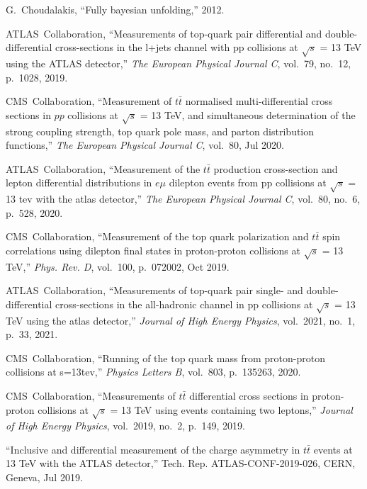 \documentclass[12pt]{article}
\begin{document}
\begin{thebibliography}{99}
G.~Choudalakis, ``Fully bayesian unfolding,'' 2012.

ATLAS~Collaboration, ``Measurements of top-quark pair differential and
  double-differential cross-sections in the l+jets channel with pp collisions at
  $\sqrt{s}$ = 13 TeV using the ATLAS
  detector,'' {\em The European Physical Journal C}, vol.~79, no.~12, p.~1028,
  2019.

CMS~Collaboration, ``Measurement of $t\bar{t}$ normalised
  multi-differential cross sections in $pp$ collisions
  at $\sqrt{s}$ = 13 TeV, and simultaneous determination of the
  strong coupling strength, top quark pole mass, and parton distribution
  functions,'' {\em The European Physical Journal C}, vol.~80, Jul 2020.

ATLAS~Collaboration, ``Measurement of the $t\bar{t}$ production cross-section and
  lepton differential distributions in $e\mu$ dilepton events from pp
  collisions at $\sqrt{s}$ = 13 tev with the atlas detector,'' {\em The
  European Physical Journal C}, vol.~80, no.~6, p.~528, 2020.

CMS~Collaboration, ``Measurement of the top quark polarization and $t\bar{t}$
  spin correlations using dilepton final states in proton-proton collisions at
  $\sqrt{s}$ = 13 TeV,'' {\em Phys. Rev. D}, vol.~100, p.~072002, Oct 2019.
 
ATLAS~Collaboration, ``Measurements of top-quark pair single- and
  double-differential cross-sections in the all-hadronic channel in pp
  collisions at $\sqrt{s}$ = 13 TeV using the atlas detector,'' {\em Journal of
  High Energy Physics}, vol.~2021, no.~1, p.~33, 2021.

CMS~Collaboration, ``Running of the top quark mass from proton-proton
  collisions at s=13tev,'' {\em Physics Letters B}, vol.~803, p.~135263, 2020.

CMS~Collaboration, ``Measurements of $t\bar{t}$ differential cross sections in proton-proton collisions at
  $\sqrt{s}$ = 13 TeV using events containing two leptons,'' {\em Journal of High
  Energy Physics}, vol.~2019, no.~2, p.~149, 2019.

``{Inclusive and differential measurement of the charge asymmetry in $t\bar{t}$
  events at 13 TeV with the ATLAS detector},'' Tech. Rep. ATLAS-CONF-2019-026,
  CERN, Geneva, Jul 2019.

\end{thebibliography}
\end{document}

